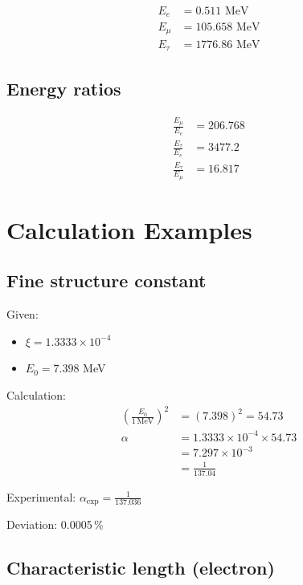 	\begin{align}
		E_e &= 0.511 \text{ MeV} \\
		E_\mu &= 105.658 \text{ MeV} \\
		E_\tau &= 1776.86 \text{ MeV}
	\end{align}
	
	\subsection{Energy ratios}
	
	\begin{align}
		\frac{E_\mu}{E_e} &= 206.768 \\
		\frac{E_\tau}{E_e} &= 3477.2 \\
		\frac{E_\tau}{E_\mu} &= 16.817
	\end{align}
	
	\section{Calculation Examples}
	\label{sec:calculations}
	
	\subsection{Fine structure constant}
	
	Given:
	\begin{itemize}
		\item $\xi = 1.3333 \times 10^{-4}$
		\item $E_0 = 7.398$ MeV
	\end{itemize}
	
	Calculation:
	\begin{align}
		\left(\frac{E_0}{1\,\text{MeV}}\right)^2 &= (7.398)^2 = 54.73 \\
		\alpha &= 1.3333 \times 10^{-4} \times 54.73 \\
		&= 7.297 \times 10^{-3} \\
		&= \frac{1}{137.04}
	\end{align}
	
	Experimental: $\alpha_{\text{exp}} = \frac{1}{137.036}$
	
	Deviation: 0.0005\,\%
	
	\subsection{Characteristic length (electron)}
	
